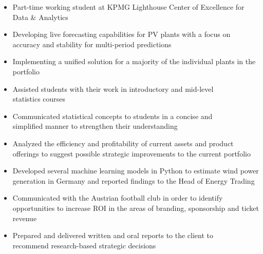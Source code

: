 \documentclass[9pt,a4paper,ragged2e]{altacv}
\begin{document}

    \begin{itemize}
        \item Part-time working student at KPMG Lighthouse Center of Excellence for Data \& Analytics
    \end{itemize}

    \divider

    \begin{itemize}
        \item Developing live forecasting capabilities for PV plants with a focus on accuracy and stability for multi-period predictions
        \item Implementing a unified solution for a majority of the individual plants in the portfolio
    \end{itemize}

    \divider

    \begin{itemize}
        \item Assisted students with their work in introductory and mid-level \\ statistics courses
        \item Communicated statistical concepts to students in a concise and \\ simplified manner to strengthen their understanding
    \end{itemize}

    \divider

    \begin{itemize}
        \item Analyzed the efficiency and profitability of current assets and product offerings to suggest possible strategic improvements to the current portfolio
        \item Developed several machine learning models in Python to estimate wind power generation in Germany and reported findings to the Head of Energy Trading
    \end{itemize}

    \divider

    \begin{itemize}
        \item Communicated with the Austrian football club in order to identify opportunities to increase ROI in the areas of branding, sponsorship and ticket revenue
        \item Prepared and delivered written and oral reports to the client to \\ recommend research-based strategic decisions
    \end{itemize}
\end{document}
